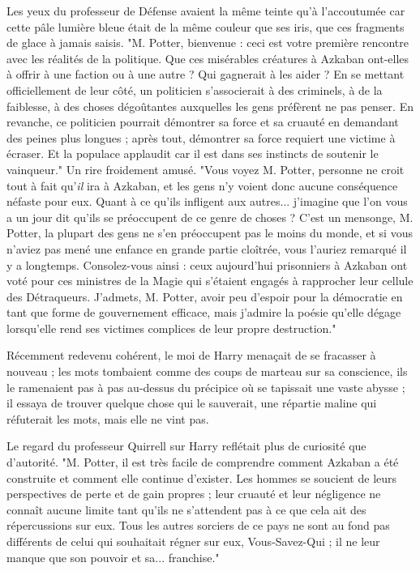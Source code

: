 Les yeux du professeur de Défense avaient la même teinte qu'à l'accoutumée car cette pâle lumière bleue était de la même couleur que ses iris, que ces fragments de glace à jamais saisis. "M. Potter, bienvenue : ceci est votre première rencontre avec les réalités de la politique. Que ces misérables créatures à Azkaban ont-elles à offrir à une faction ou à une autre ? Qui gagnerait à les aider ? En se mettant officiellement de leur côté, un politicien s'associerait à des criminels, à de la faiblesse, à des choses dégoûtantes auxquelles les gens préfèrent ne pas penser. En revanche, ce politicien pourrait démontrer sa force et sa cruauté en demandant des peines plus longues ; après tout, démontrer sa force requiert une victime à écraser. Et la populace applaudit car il est dans ses instincts de soutenir le vainqueur." Un rire froidement amusé. "Vous voyez M. Potter, personne ne croit tout à fait qu'\emph{il}  ira à Azkaban, et les gens n'y voient donc aucune conséquence néfaste pour eux. Quant à ce qu'ils infligent aux autres... j'imagine que l'on vous a un jour dit qu'ils se préoccupent de ce genre de choses ? C'est un mensonge, M. Potter, la plupart des gens ne s'en préoccupent pas le moins du monde, et si vous n'aviez pas mené une enfance en grande partie cloîtrée, vous l'auriez remarqué il y a longtemps. Consolez-vous ainsi : ceux aujourd'hui prisonniers à Azkaban ont voté pour ces ministres de la Magie qui s'étaient engagés à rapprocher leur cellule des Détraqueurs. J'admets, M. Potter, avoir peu d'espoir pour la démocratie en tant que forme de gouvernement efficace, mais j'admire la poésie qu'elle dégage lorsqu'elle rend ses victimes complices de leur propre destruction."

Récemment redevenu cohérent, le moi de Harry menaçait de se fracasser à nouveau ; les mots tombaient comme des coups de marteau sur sa conscience, ils le ramenaient pas à pas au-dessus du précipice où se tapissait une vaste abysse ; il essaya de trouver quelque chose qui le sauverait, une répartie maline qui réfuterait les mots, mais elle ne vint pas.

Le regard du professeur Quirrell sur Harry reflétait plus de curiosité que d'autorité. "M. Potter, il est très facile de comprendre comment Azkaban a été construite et comment elle continue d'exister. Les hommes se soucient de leurs perspectives de perte et de gain propres ; leur cruauté et leur négligence ne connaît aucune limite tant qu'ils ne s'attendent pas à ce que cela ait des répercussions sur eux. Tous les autres sorciers de ce pays ne sont au fond pas différents de celui qui souhaitait régner sur eux, Vous-Savez-Qui ; il ne leur manque que son pouvoir et sa... franchise."

